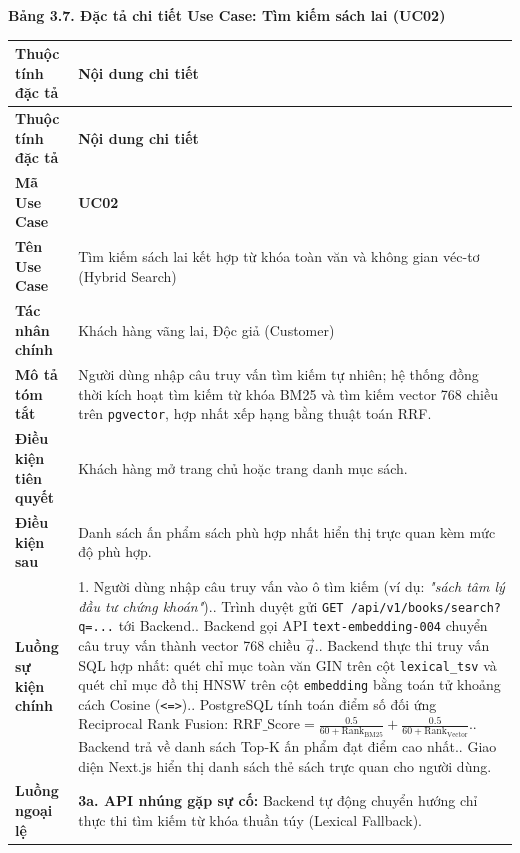 \documentclass[11pt, a4paper]{report}
\begin{document}
\vspace{0.3cm}
\noindent\textbf{Bảng 3.7. Đặc tả chi tiết Use Case: Tìm kiếm sách lai (UC02)}

\begin{longtable}{p{3.8cm} p{10.5cm}}
\toprule
\textbf{Thuộc tính đặc tả} & \textbf{Nội dung chi tiết} \\
\midrule
\endfirsthead
\toprule
\textbf{Thuộc tính đặc tả} & \textbf{Nội dung chi tiết} \\
\midrule
\endhead
\bottomrule
\endfoot
\textbf{Mã Use Case} & \textbf{UC02} \\
\midrule
\textbf{Tên Use Case} & Tìm kiếm sách lai kết hợp từ khóa toàn văn và không gian véc-tơ (Hybrid Search) \\
\midrule
\textbf{Tác nhân chính} & Khách hàng vãng lai, Độc giả (Customer) \\
\midrule
\textbf{Mô tả tóm tắt} & Người dùng nhập câu truy vấn tìm kiếm tự nhiên; hệ thống đồng thời kích hoạt tìm kiếm từ khóa BM25 và tìm kiếm vector 768 chiều trên \texttt{pgvector}, hợp nhất xếp hạng bằng thuật toán RRF. \\
\midrule
\textbf{Điều kiện tiên quyết} & Khách hàng mở trang chủ hoặc trang danh mục sách. \\
\midrule
\textbf{Điều kiện sau} & Danh sách ấn phẩm sách phù hợp nhất hiển thị trực quan kèm mức độ phù hợp. \\
\midrule
\textbf{Luồng sự kiện chính} & 
1. Người dùng nhập câu truy vấn vào ô tìm kiếm (ví dụ: \textit{"sách tâm lý đầu tư chứng khoán"}).\newline
2. Trình duyệt gửi \texttt{GET /api/v1/books/search?q=...} tới Backend.\newline
3. Backend gọi API \texttt{text-embedding-004} chuyển câu truy vấn thành vector 768 chiều $\vec{q}$.\newline
4. Backend thực thi truy vấn SQL hợp nhất: quét chỉ mục toàn văn GIN trên cột \texttt{lexical\_tsv} và quét chỉ mục đồ thị HNSW trên cột \texttt{embedding} bằng toán tử khoảng cách Cosine (\texttt{<=>}).\newline
5. PostgreSQL tính toán điểm số đối ứng Reciprocal Rank Fusion: $\text{RRF\_Score} = \frac{0.5}{60 + \text{Rank}_{\text{BM25}}} + \frac{0.5}{60 + \text{Rank}_{\text{Vector}}}$.\newline
6. Backend trả về danh sách Top-K ấn phẩm đạt điểm cao nhất.\newline
7. Giao diện Next.js hiển thị danh sách thẻ sách trực quan cho người dùng. \\
\midrule
\textbf{Luồng ngoại lệ} & 
\textbf{3a. API nhúng gặp sự cố:} Backend tự động chuyển hướng chỉ thực thi tìm kiếm từ khóa thuần túy (Lexical Fallback). \\
\bottomrule
\end{longtable}
\end{document}
